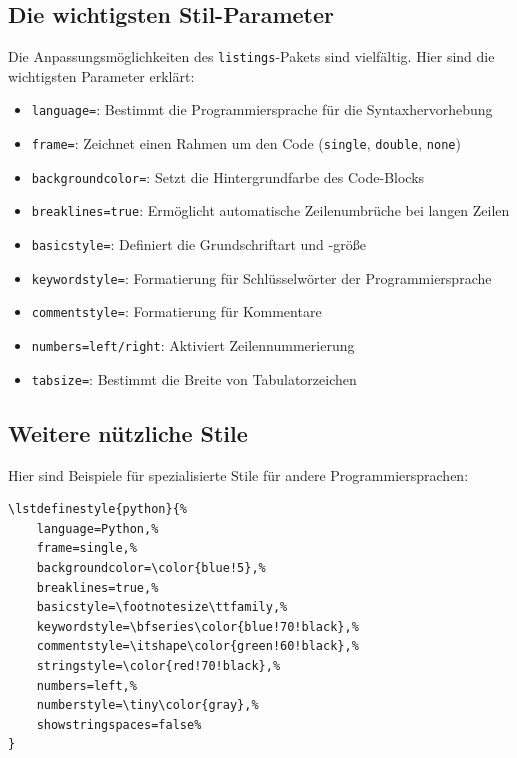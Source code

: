 \subsection{Die wichtigsten Stil-Parameter}

Die Anpassungsmöglichkeiten des \texttt{listings}-Pakets sind vielfältig. Hier sind die wichtigsten Parameter erklärt:

\begin{itemize}
    \item \texttt{language=}: Bestimmt die Programmiersprache für die Syntaxhervorhebung
    \item \texttt{frame=}: Zeichnet einen Rahmen um den Code (\texttt{single}, \texttt{double}, \texttt{none})
    \item \texttt{backgroundcolor=}: Setzt die Hintergrundfarbe des Code-Blocks
    \item \texttt{breaklines=true}: Ermöglicht automatische Zeilenumbrüche bei langen Zeilen
    \item \texttt{basicstyle=}: Definiert die Grundschriftart und -größe
    \item \texttt{keywordstyle=}: Formatierung für Schlüsselwörter der Programmiersprache
    \item \texttt{commentstyle=}: Formatierung für Kommentare
    \item \texttt{numbers=left/right}: Aktiviert Zeilennummerierung
    \item \texttt{tabsize=}: Bestimmt die Breite von Tabulatorzeichen
\end{itemize}



\subsection{Weitere nützliche Stile}

Hier sind Beispiele für spezialisierte Stile für andere Programmiersprachen:

\begin{lstlisting}[style=latex]
% Stil fuer Python-Code
\lstdefinestyle{python}{%
	language=Python,%
	frame=single,%
	backgroundcolor=\color{blue!5},%
	breaklines=true,%
	basicstyle=\footnotesize\ttfamily,%
	keywordstyle=\bfseries\color{blue!70!black},%
	commentstyle=\itshape\color{green!60!black},%
	stringstyle=\color{red!70!black},%
	numbers=left,%
	numberstyle=\tiny\color{gray},%
	showstringspaces=false%
}
\end{lstlisting}

